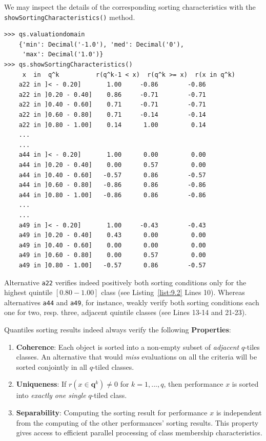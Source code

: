 We may inspect the details of the corresponding sorting characteristics with the \texttt{showSortingCharacteristics()} method.
\begin{lstlisting}[caption={Bipolar-valued sorting characteristics (extract)},label=list:9.2]
>>> qs.valuationdomain
    {'min': Decimal('-1.0'), 'med': Decimal('0'),
     'max': Decimal('1.0')}
>>> qs.showSortingCharacteristics()
     x  in  q^k          r(q^k-1 < x)  r(q^k >= x)  r(x in q^k)
    a22 in ]< - 0.20]	    1.00	 -0.86	      -0.86
    a22 in ]0.20 - 0.40]    0.86	 -0.71	      -0.71
    a22 in ]0.40 - 0.60]    0.71	 -0.71	      -0.71
    a22 in ]0.60 - 0.80]    0.71	 -0.14	      -0.14
    a22 in ]0.80 - 1.00]    0.14	  1.00	       0.14
    ...
    ...
    a44 in ]< - 0.20]	    1.00	  0.00	       0.00
    a44 in ]0.20 - 0.40]    0.00	  0.57	       0.00
    a44 in ]0.40 - 0.60]   -0.57	  0.86	      -0.57
    a44 in ]0.60 - 0.80]   -0.86	  0.86	      -0.86
    a44 in ]0.80 - 1.00]   -0.86	  0.86	      -0.86
    ...
    ...
    a49 in ]< - 0.20]	    1.00	 -0.43	      -0.43
    a49 in ]0.20 - 0.40]    0.43	  0.00	       0.00
    a49 in ]0.40 - 0.60]    0.00	  0.00	       0.00
    a49 in ]0.60 - 0.80]    0.00	  0.57	       0.00
    a49 in ]0.80 - 1.00]   -0.57	  0.86	      -0.57
\end{lstlisting}
Alternative \texttt{a22} verifies indeed positively both sorting conditions only for the highest quintile $[0.80 - 1.00]$ class (see Listing~\vref{list:9.2} Lines 10). Whereas alternatives \texttt{a44} and \texttt{a49}, for instance, weakly verify both sorting conditions each one for two, resp. three, adjacent quintile classes (see Lines 13-14 and 21-23).  

Quantiles sorting results indeed always verify the following \textbf{Properties}:
\begin{enumerate}[leftmargin=0.5cm,rightmargin=0.5cm,topsep=1pt]
\item \textbf{Coherence}: Each object is sorted into a non-empty subset of \emph{adjacent} $q$-tiles classes. An alternative that would \emph{miss} evaluations on all the criteria will be sorted conjointly in all $q$-tiled classes.
\item \textbf{Uniqueness}: If $r(x \in \mathbf{q}^k) \neq 0$  for $k = 1, ..., q$, then performance $x$ is sorted into \emph{exactly one single} $q$-tiled class.
\item \textbf{Separability}: Computing the sorting result for performance $x$ is independent from the computing of the other performances’ sorting results. This property gives access to efficient parallel processing of class membership characteristics.
\end{enumerate}

